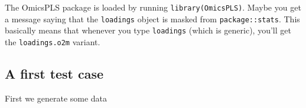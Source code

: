 \documentclass[]{article}
\newenvironment{Shaded}{\begin{snugshade}}{\end{snugshade}}
\newcommand{\CommentTok}[1]{\textcolor[rgb]{0.56,0.35,0.01}{\textit{#1}}}
\newcommand{\DataTypeTok}[1]{\textcolor[rgb]{0.13,0.29,0.53}{#1}}
\newcommand{\DecValTok}[1]{\textcolor[rgb]{0.00,0.00,0.81}{#1}}
\newcommand{\KeywordTok}[1]{\textcolor[rgb]{0.13,0.29,0.53}{\textbf{#1}}}
\newcommand{\NormalTok}[1]{#1}
\newcommand{\OperatorTok}[1]{\textcolor[rgb]{0.81,0.36,0.00}{\textbf{#1}}}
\newcommand{\StringTok}[1]{\textcolor[rgb]{0.31,0.60,0.02}{#1}}
\begin{document}
The OmicsPLS package is loaded by running \texttt{library(OmicsPLS)}.
Maybe you get a message saying that the \texttt{loadings} object is
masked from \texttt{package::stats}. This basically means that whenever
you type \texttt{loadings} (which is generic), you'll get the
\texttt{loadings.o2m} variant.

\hypertarget{a-first-test-case}{%
\subsection{A first test case}\label{a-first-test-case}}

First we generate some data

\begin{Shaded}
\end{Shaded}
\end{document}
